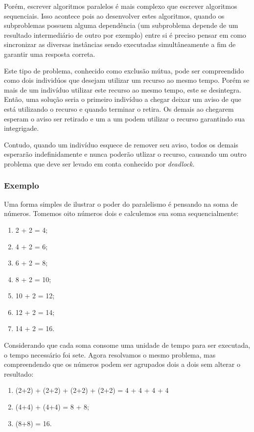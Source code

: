    Porém, escrever algoritmos paralelos é mais complexo que escrever algoritmos sequenciais. Isso acontece pois ao desenvolver estes algoritmos, quando os subproblemas possuem alguma dependência (um subproblema depende de um resultado intermediário de outro por exemplo) entre si é preciso pensar em como sincronizar as diversas instâncias sendo executadas simultâneamente a fim de garantir uma resposta correta.
    
    Este tipo de problema, conhecido como exclusão mútua, pode ser compreendido como dois individúos que desejam utilizar um recurso ao mesmo tempo. Porém se mais de um indivíduo utilizar este recurso ao mesmo tempo, este se desintegra. Então, uma solução seria o primeiro indivíduo a chegar deixar um aviso de que está utilizando o recurso e quando terminar o retira. Os demais ao chegarem esperam o aviso ser retirado e um a um podem utilizar o recurso garantindo sua integrigade.
    
    Contudo, quando um indivíduo esquece de remover seu aviso, todos os demais esperarão indefinidamente e nunca poderão utlizar o recurso, causando um outro problema que deve ser levado em conta conhecido por \textit{deadlock}.
    
    \subsubsection{Exemplo}
    
    Uma forma simples de ilustrar o poder do paralelismo é pensando na soma de números. Tomemos oito números dois e calculemos sua soma sequencialmente:
    \begin{enumerate}
      \item 2 + 2 = 4;
      \item 4 + 2 = 6;
      \item 6 + 2 = 8;
      \item 8 + 2 = 10;
      \item 10 + 2 = 12;
      \item 12 + 2 = 14;
      \item 14 + 2 = 16.
    \end{enumerate}
    
    Considerando que cada soma consome uma unidade de tempo para ser executada, o tempo necessário foi sete. Agora resolvamos o mesmo problema, mas compreendendo que os números podem ser agrupados dois a dois sem alterar o resultado:
    \begin{enumerate}
      \item (2+2) + (2+2) + (2+2) + (2+2) = 4 + 4 + 4 + 4
      \item (4+4) + (4+4) = 8 + 8;
      \item (8+8) = 16.
    \end{enumerate}
    
